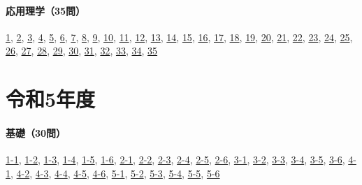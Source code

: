 \paragraph{応用理学（35問）} \hyperref[q:r04-reg-applied-01]{1}, \hyperref[q:r04-reg-applied-02]{2}, \hyperref[q:r04-reg-applied-03]{3}, \hyperref[q:r04-reg-applied-04]{4}, \hyperref[q:r04-reg-applied-05]{5}, \hyperref[q:r04-reg-applied-06]{6}, \hyperref[q:r04-reg-applied-07]{7}, \hyperref[q:r04-reg-applied-08]{8}, \hyperref[q:r04-reg-applied-09]{9}, \hyperref[q:r04-reg-applied-10]{10}, \hyperref[q:r04-reg-applied-11]{11}, \hyperref[q:r04-reg-applied-12]{12}, \hyperref[q:r04-reg-applied-13]{13}, \hyperref[q:r04-reg-applied-14]{14}, \hyperref[q:r04-reg-applied-15]{15}, \hyperref[q:r04-reg-applied-16]{16}, \hyperref[q:r04-reg-applied-17]{17}, \hyperref[q:r04-reg-applied-18]{18}, \hyperref[q:r04-reg-applied-19]{19}, \hyperref[q:r04-reg-applied-20]{20}, \hyperref[q:r04-reg-applied-21]{21}, \hyperref[q:r04-reg-applied-22]{22}, \hyperref[q:r04-reg-applied-23]{23}, \hyperref[q:r04-reg-applied-24]{24}, \hyperref[q:r04-reg-applied-25]{25}, \hyperref[q:r04-reg-applied-26]{26}, \hyperref[q:r04-reg-applied-27]{27}, \hyperref[q:r04-reg-applied-28]{28}, \hyperref[q:r04-reg-applied-29]{29}, \hyperref[q:r04-reg-applied-30]{30}, \hyperref[q:r04-reg-applied-31]{31}, \hyperref[q:r04-reg-applied-32]{32}, \hyperref[q:r04-reg-applied-33]{33}, \hyperref[q:r04-reg-applied-34]{34}, \hyperref[q:r04-reg-applied-35]{35}
\section{令和5年度}
\paragraph{基礎（30問）} \hyperref[q:r05-reg-basic-1-1]{1-1}, \hyperref[q:r05-reg-basic-1-2]{1-2}, \hyperref[q:r05-reg-basic-1-3]{1-3}, \hyperref[q:r05-reg-basic-1-4]{1-4}, \hyperref[q:r05-reg-basic-1-5]{1-5}, \hyperref[q:r05-reg-basic-1-6]{1-6}, \hyperref[q:r05-reg-basic-2-1]{2-1}, \hyperref[q:r05-reg-basic-2-2]{2-2}, \hyperref[q:r05-reg-basic-2-3]{2-3}, \hyperref[q:r05-reg-basic-2-4]{2-4}, \hyperref[q:r05-reg-basic-2-5]{2-5}, \hyperref[q:r05-reg-basic-2-6]{2-6}, \hyperref[q:r05-reg-basic-3-1]{3-1}, \hyperref[q:r05-reg-basic-3-2]{3-2}, \hyperref[q:r05-reg-basic-3-3]{3-3}, \hyperref[q:r05-reg-basic-3-4]{3-4}, \hyperref[q:r05-reg-basic-3-5]{3-5}, \hyperref[q:r05-reg-basic-3-6]{3-6}, \hyperref[q:r05-reg-basic-4-1]{4-1}, \hyperref[q:r05-reg-basic-4-2]{4-2}, \hyperref[q:r05-reg-basic-4-3]{4-3}, \hyperref[q:r05-reg-basic-4-4]{4-4}, \hyperref[q:r05-reg-basic-4-5]{4-5}, \hyperref[q:r05-reg-basic-4-6]{4-6}, \hyperref[q:r05-reg-basic-5-1]{5-1}, \hyperref[q:r05-reg-basic-5-2]{5-2}, \hyperref[q:r05-reg-basic-5-3]{5-3}, \hyperref[q:r05-reg-basic-5-4]{5-4}, \hyperref[q:r05-reg-basic-5-5]{5-5}, \hyperref[q:r05-reg-basic-5-6]{5-6}
